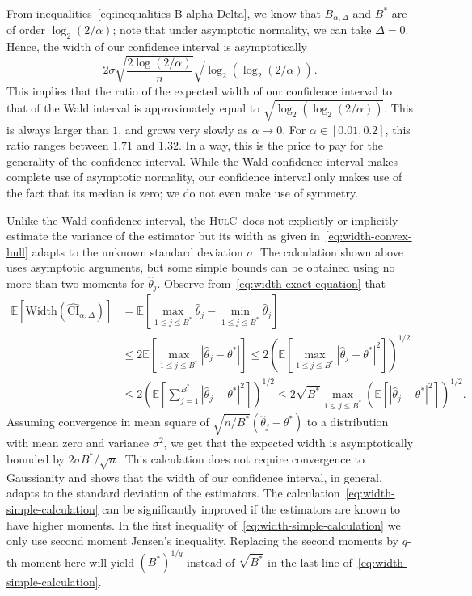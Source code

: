 \documentclass{article}
\newcommand{\hulc}{\textsc{HulC}~}
\numberwithin{myalgctr}{section}
\begin{document}
From inequalities~\eqref{eq:inequalities-B-alpha-Delta}, we know that $B_{\alpha,\Delta}$ and $B^*$ are of order $\log_2(2/\alpha)$; note that under asymptotic normality, we can take $\Delta = 0$. Hence, the width of our confidence interval is asymptotically
\begin{equation}\label{eq:width-convex-hull}
2\sigma\sqrt{\frac{2\log(2/\alpha)}{n}}\sqrt{\log_2(\log_2(2/\alpha))}.
\end{equation}
This implies that the ratio of the expected width of our confidence interval to that of the Wald interval is approximately equal to $\sqrt{\log_2(\log_2(2/\alpha))}$.
This is always larger than $1$, and grows very slowly as $\alpha\to0$. For $\alpha\in[0.01, 0.2]$, this ratio ranges between $1.71$ and $1.32$. In a way, this is the price to pay for the generality of the confidence interval. While the Wald confidence interval makes complete use of asymptotic normality, our confidence interval only makes use of the fact that its median is zero; we do not even make use of symmetry. 

Unlike the Wald confidence interval, the \hulc does not explicitly or implicitly estimate the variance of the estimator but its width as given in~\eqref{eq:width-convex-hull} adapts to the unknown standard deviation $\sigma$. The calculation shown above uses asymptotic arguments, but some simple bounds can be obtained using no more than two moments for $\widehat{\theta}_j$. Observe from~\eqref{eq:width-exact-equation} that
\begin{equation}\label{eq:width-simple-calculation}
\begin{split}
\mathbb{E}\left[\mbox{Width}(\widehat{\mathrm{CI}}_{\alpha,\Delta})\right] &= \mathbb{E}\left[\max_{1\le j\le B^*}\widehat{\theta}_j - \min_{1\le j\le B^*}\widehat{\theta}_j\right]\\
&\le 2\mathbb{E}\left[\max_{1\le j\le B^*}|\widehat{\theta}_j - \theta^*|\right] \le 2\left(\mathbb{E}\left[\max_{1\le j\le B^*}|\widehat{\theta}_j - \theta^*|^2\right]\right)^{1/2}\\
&\le 2\left(\mathbb{E}\left[\sum_{j=1}^{B^*}|\widehat{\theta}_j - \theta^*|^2\right]\right)^{1/2} \le 2\sqrt{B^*}\max_{1\le j\le B^*}\left(\mathbb{E}[|\widehat{\theta}_j - \theta^*|^2]\right)^{1/2}.
\end{split}
\end{equation}
Assuming convergence in mean square of $\sqrt{n/B^*}(\widehat{\theta}_j - \theta^*)$ to a distribution with mean zero and variance $\sigma^2$, we get that the expected width is asymptotically bounded by $2\sigma B^*/\sqrt{n}$. This calculation does not require convergence to Gaussianity and shows that the width of our confidence interval, in general, adapts to the standard deviation of the estimators. The calculation~\eqref{eq:width-simple-calculation} can be significantly improved if the estimators are known to have higher moments. In the first inequality of~\eqref{eq:width-simple-calculation} we only use second moment Jensen's inequality. Replacing the second moments by $q$-th moment here will yield $(B^*)^{1/q}$ instead of $\sqrt{B^*}$ in the last line of~\eqref{eq:width-simple-calculation}.
\end{document}

